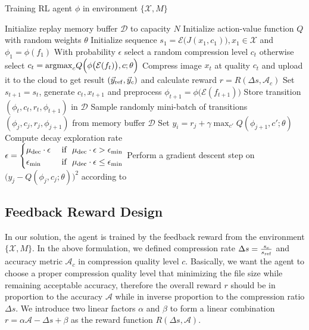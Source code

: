 \begin{algorithm}[htbp]
    \caption{Training RL agent $ \phi $ in environment $ \{\mathcal{X}, M\} $}
    \label{alg: rl-train}
    \begin{algorithmic}[1]
        \STATE Initialize replay memory buffer $ \mathcal{D} $ to capacity $ N $
        \STATE Initialize action-value function $ Q $ with random weights $ \theta $
        \STATE Initialize sequence $ s_1 = \mathcal{E}\big(J(x_1, c_1)\big), x_1 \in \mathcal{X} $ and $ \phi_1 = \phi(f_1) $
        \STATE With probability $ \epsilon $ select a random compression level $ c_t $ otherwise select $ c_t = {\rm argmax}_cQ\Big(\phi\big(\mathcal{E}(f_t)\big), c; \theta\Big) $
        \STATE Compress image $ x_t $ at quality $ c_t $ and upload it to the cloud to get result $ (\vec{y}_{\rm ref}, \vec{y}_c) $ and calculate reward $ r = R(\Delta s, \mathcal{A}_c) $
        \STATE Set $ s_{t+1} = s_t $, generate $ c_t, x_{t+1} $ and preprocess $ \phi_{t+1} = \phi \big(\mathcal{E}(f_{t+1})\big) $
        \STATE Store transition $ (\phi_t, c_t, r_t, \phi_{t+1}) $ in $ \mathcal{D} $
        \STATE Sample randomly mini-batch of transitions \\ $ (\phi_j, c_j, r_j, \phi_{j+1}) $ from memory buffer $ \mathcal{D} $
        \STATE Set $ y_i = r_j + \gamma \max_{c'}Q(\phi_{j+1}, c'; \theta) $
        \STATE Compute decay exploration rate \\
        $ \epsilon = 
        \begin{cases}
        \mu_{\rm dec}\cdot \epsilon & \text{ if } \ \mu_{\rm dec}\cdot \epsilon > \epsilon_{\min} \\ 
        \epsilon_{\min}             & \text{ if } \ \mu_{\rm dec}\cdot \epsilon \leq \epsilon_{\min}
        \end{cases} $
        \STATE Perform a gradient descent step on \\ $ \big(y_j - Q(\phi_j, c_j; \theta)\big)^2 $ according to ~\cite{DQN}
        \ENDIF
        \ENDFOR
    \end{algorithmic}
\end{algorithm}


\subsection{Feedback Reward Design}

In our solution, the agent is trained by the feedback reward from the environment $ \{\mathcal{X}, M\} $. In the above formulation, we defined compression rate $ \Delta s = \frac{s_c}{s_{\rm ref}} $ and accuracy metric $ \mathcal{A}_c $ in compression quality level $ c $. Basically, we want the agent to choose a proper compression quality level that minimizing the file size while remaining acceptable accuracy, therefore the overall reward $ r $ should be in proportion to the accuracy $ \mathcal{A} $ while in inverse proportion to the compression ratio $ \Delta s $. We introduce two linear factors $ \alpha $ and $ \beta $ to form a linear combination $ r = \alpha \mathcal{A} - \Delta s + \beta $ as the reward function $ R(\Delta s, \mathcal{A}) $. %

